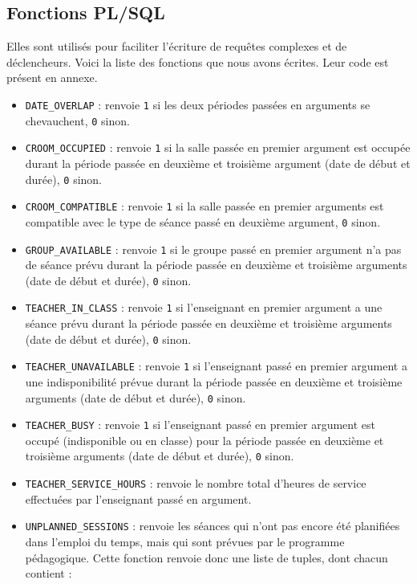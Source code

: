 \documentclass{article}
\begin{document}
\newpage
\subsection{Fonctions PL/SQL}
Elles sont utilisés pour faciliter l'écriture de requêtes complexes et de déclencheurs. Voici la liste des fonctions que nous avons écrites. Leur code est présent en annexe.
\begin{itemize}
\item \texttt{DATE\_OVERLAP} : renvoie \texttt{1} si les deux périodes passées en arguments se chevauchent, \texttt{0} sinon.
\item \texttt{CROOM\_OCCUPIED} : renvoie \texttt{1} si la salle passée en premier argument est occupée durant la période passée en deuxième et troisième argument (date de début et durée), \texttt{0} sinon.
\item \texttt{CROOM\_COMPATIBLE} : renvoie \texttt{1} si la salle passée en premier arguments est compatible avec le type de séance passé en deuxième argument, \texttt{0} sinon.
\item \texttt{GROUP\_AVAILABLE} : renvoie \texttt{1} si le groupe passé en premier argument n'a pas de séance prévu durant la période passée en deuxième et troisième arguments (date de début et durée), \texttt{0} sinon.
\item \texttt{TEACHER\_IN\_CLASS} : renvoie \texttt{1} si l'enseignant en premier argument a une séance prévu durant la période passée en deuxième et troisième arguments (date de début et durée), \texttt{0} sinon.
\item \texttt{TEACHER\_UNAVAILABLE} : renvoie \texttt{1} si l'enseignant passé en premier argument a une indisponibilité prévue durant la période passée en deuxième et troisième arguments (date de début et durée), \texttt{0} sinon.
\item \texttt{TEACHER\_BUSY} : renvoie \texttt{1} si l'enseignant passé en premier argument est occupé (indisponible ou en classe) pour la période passée en deuxième et troisième arguments (date de début et durée), \texttt{0} sinon.
\item \texttt{TEACHER\_SERVICE\_HOURS} : renvoie le nombre total d'heures de service effectuées par l'enseignant passé en argument.
\item \texttt{UNPLANNED\_SESSIONS} : renvoie les séances qui n'ont pas encore été planifiées dans l'emploi du temps, mais qui sont prévues par le programme pédagogique. Cette fonction renvoie donc une liste de tuples, dont chacun contient :
\begin{itemize}

\end{itemize}
\end{itemize}
\end{document}
